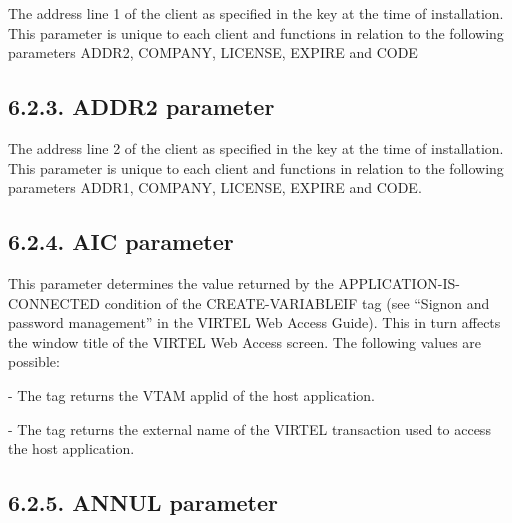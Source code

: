 \documentclass[letterpaper,10pt,english]{sphinxmanual}
\begin{document}
The address line 1 of the client as specified in the key at the time of installation. This parameter is unique to each client and functions in relation to the following parameters ADDR2, COMPANY, LICENSE, EXPIRE and CODE


\subsection{6.2.3. ADDR2 parameter}
\label{\detokenize{Installation_Guide:addr2-parameter}}
\begin{sphinxVerbatim}[commandchars=\\\{\}]
 
\end{sphinxVerbatim}

The address line 2 of the client as specified in the key at the time of installation. This parameter is unique to each client and functions in relation to the following parameters ADDR1, COMPANY, LICENSE, EXPIRE and CODE.


\subsection{6.2.4. AIC parameter}
\label{\detokenize{Installation_Guide:aic-parameter}}
\begin{sphinxVerbatim}[commandchars=\\\{\}]
 
\end{sphinxVerbatim}

This parameter determines the value returned by the APPLICATION-IS-CONNECTED condition of the CREATE-VARIABLEIF tag (see “Signon and password management” in the VIRTEL Web Access Guide). This in turn affects the window title of the VIRTEL Web Access screen. The following values are possible:

 - The tag returns the VTAM applid of the host application.

 - The tag returns the external name of the VIRTEL transaction used to access the host application.


\subsection{6.2.5. ANNUL parameter}
\label{\detokenize{Installation_Guide:annul-parameter}}
\begin{sphinxVerbatim}[commandchars=\\\{\}]
  
\end{sphinxVerbatim}
\end{document}
